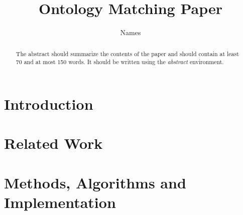 \documentclass[runningheads,a4paper]{StyleFiles/llncs}
\begin{document}
\mainmatter  %

\title{Ontology Matching Paper}


%
%
\author{Names}
%


\maketitle


\begin{abstract}
The abstract should summarize the contents of the paper and should
contain at least 70 and at most 150 words. It should be written using the
\emph{abstract} environment.
\end{abstract}


\section{Introduction}

\section{Related Work}

\section{Methods, Algorithms and Implementation}
\end{document}
